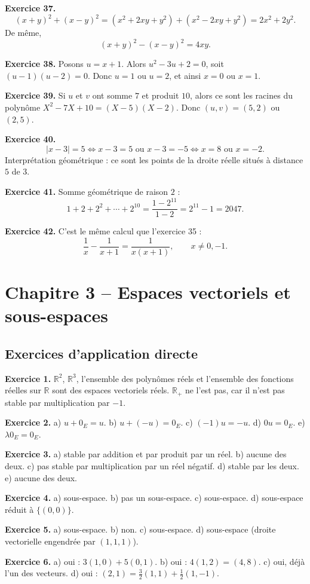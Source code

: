 \documentclass[11pt,a4paper]{article}
\newcommand{\R}{\mathbb R}
\begin{document}
\textbf{Exercice 37.}
\[(x+y)^2+(x-y)^2=(x^2+2xy+y^2)+(x^2-2xy+y^2)=2x^2+2y^2.
\]
De même,
\[(x+y)^2-(x-y)^2=4xy.\]

\textbf{Exercice 38.} Posons $u=x+1$. Alors $u^2-3u+2=0$, soit $(u-1)(u-2)=0$. Donc $u=1$ ou $u=2$, et ainsi $x=0$ ou $x=1$.

\textbf{Exercice 39.} Si $u$ et $v$ ont somme $7$ et produit $10$, alors ce sont les racines du polynôme $X^2-7X+10=(X-5)(X-2)$. Donc $(u,v)=(5,2)$ ou $(2,5)$.

\textbf{Exercice 40.} 
\[|x-3|=5 \iff x-3=5 \text{ ou } x-3=-5 \iff x=8 \text{ ou } x=-2.\]
Interprétation géométrique : ce sont les points de la droite réelle situés à distance $5$ de $3$.

\textbf{Exercice 41.} Somme géométrique de raison $2$ :
\[1+2+2^2+\cdots+2^{10}=\frac{1-2^{11}}{1-2}=2^{11}-1=2047.\]

\textbf{Exercice 42.} C'est le même calcul que l'exercice 35 :
\[\frac1x-\frac1{x+1}=\frac1{x(x+1)},\qquad x\neq 0,-1.\]

\newpage
\section{Chapitre 3 -- Espaces vectoriels et sous-espaces}
\subsection*{Exercices d'application directe}
\textbf{Exercice 1.} $\R^2$, $\R^3$, l'ensemble des polynômes réels et l'ensemble des fonctions réelles sur $\R$ sont des espaces vectoriels réels. $\R_+$ ne l'est pas, car il n'est pas stable par multiplication par $-1$.

\textbf{Exercice 2.} a) $u+0_E=u$. b) $u+(-u)=0_E$. c) $(-1)u=-u$. d) $0u=0_E$. e) $\lambda 0_E=0_E$.

\textbf{Exercice 3.} a) stable par addition et par produit par un réel. b) aucune des deux. c) pas stable par multiplication par un réel négatif. d) stable par les deux. e) aucune des deux.

\textbf{Exercice 4.} a) sous-espace. b) pas un sous-espace. c) sous-espace. d) sous-espace réduit à $\{(0,0)\}$.

\textbf{Exercice 5.} a) sous-espace. b) non. c) sous-espace. d) sous-espace (droite vectorielle engendrée par $(1,1,1)$).

\textbf{Exercice 6.} a) oui : $3(1,0)+5(0,1)$. b) oui : $4(1,2)=(4,8)$. c) oui, déjà l'un des vecteurs. d) oui : $(2,1)=\frac32(1,1)+\frac12(1,-1)$.
\end{document}
